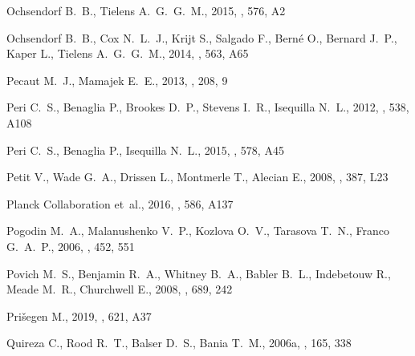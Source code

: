 \documentclass[useAMS, usenatbib, a4paper]{mnras}
\begin{document}
\begin{thebibliography}{}
{Ochsendorf} B.~B.,  {Tielens} A.~G.~G.~M.,  2015, \aap, 576, A2

{Ochsendorf} B.~B.,  {Cox} N.~L.~J.,  {Krijt} S.,  {Salgado} F.,  {Bern{\'e}}
  O.,  {Bernard} J.~P.,  {Kaper} L.,   {Tielens} A.~G.~G.~M.,  2014, \aap, 563,
  A65

{Pecaut} M.~J.,  {Mamajek} E.~E.,  2013, \apjs, 208, 9

{Peri} C.~S.,  {Benaglia} P.,  {Brookes} D.~P.,  {Stevens} I.~R.,   {Isequilla}
  N.~L.,  2012, \aap, 538, A108

{Peri} C.~S.,  {Benaglia} P.,   {Isequilla} N.~L.,  2015, \aap, 578, A45

{Petit} V.,  {Wade} G.~A.,  {Drissen} L.,  {Montmerle} T.,   {Alecian} E.,
  2008, \mnras, 387, L23

{Planck Collaboration} et~al., 2016, \aap, 586, A137

{Pogodin} M.~A.,  {Malanushenko} V.~P.,  {Kozlova} O.~V.,  {Tarasova} T.~N.,
  {Franco} G.~A.~P.,  2006, \aap, 452, 551

{Povich} M.~S.,  {Benjamin} R.~A.,  {Whitney} B.~A.,  {Babler} B.~L.,
  {Indebetouw} R.,  {Meade} M.~R.,   {Churchwell} E.,  2008, \apj, 689, 242

{Prišegen} M.,  2019, \aap, 621, A37

{Quireza} C.,  {Rood} R.~T.,  {Balser} D.~S.,   {Bania} T.~M.,  2006a, \apjs,
  165, 338


\end{thebibliography}
\end{document}
